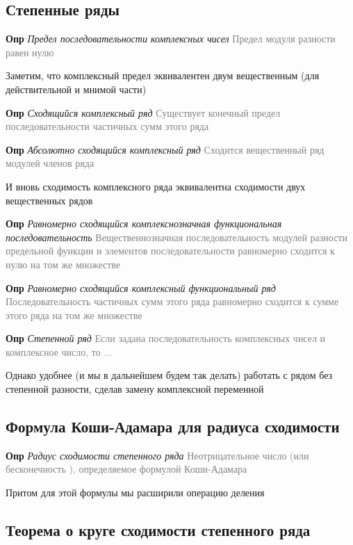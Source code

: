 \subsection{Степенные ряды}

\textbf{Опр} \textit{Предел последовательности комплексных чисел} \textcolor{gray}{Предел модуля разности равен
нулю}

Заметим, что комплексный предел эквивалентен двум вещественным (для действительной и мнимой части)

\textbf{Опр} \textit{Сходящийся комплексный ряд} \textcolor{gray}{Существует конечный предел последовательности
частичных сумм этого ряда}

\textbf{Опр} \textit{Абсолютно сходящийся комплексный ряд} \textcolor{gray}{Сходится вещественный ряд модулей
членов ряда}

И вновь сходимость комплексного ряда эквивалентна сходимости двух вещественных рядов

\textbf{Опр} \textit{Равномерно сходящийся комплекснозначная функциональная последовательность} \textcolor{gray}{
    Вещественнозначная последовательность модулей разности предельной функции и элементов последовательности
    равномерно сходится к нулю на том же множестве}

\textbf{Опр} \textit{Равномерно сходящийся комплексный функциональный ряд} \textcolor{gray}{Последовательность
частичных сумм этого ряда равномерно сходится к сумме этого ряда на том же множестве}

\textbf{Опр} \textit{Степенной ряд} \textcolor{gray}{Если задана последовательность комплексных чисел
и комплексное число, то ...}

Однако удобнее (и мы в дальнейшем будем так делать) работать с рядом без степенной разности, сделав замену
комплексной переменной

\subsection{Формула Коши-Адамара для радиуса сходимости}

\textbf{Опр} \textit{Радиус сходимости степенного ряда} \textcolor{gray}{Неотрицательное число (или бесконечность
    ), определяемое формулой Коши-Адамара}

Притом для этой формулы мы расширили операцию деления

\subsection{Теорема о круге сходимости степенного ряда}

